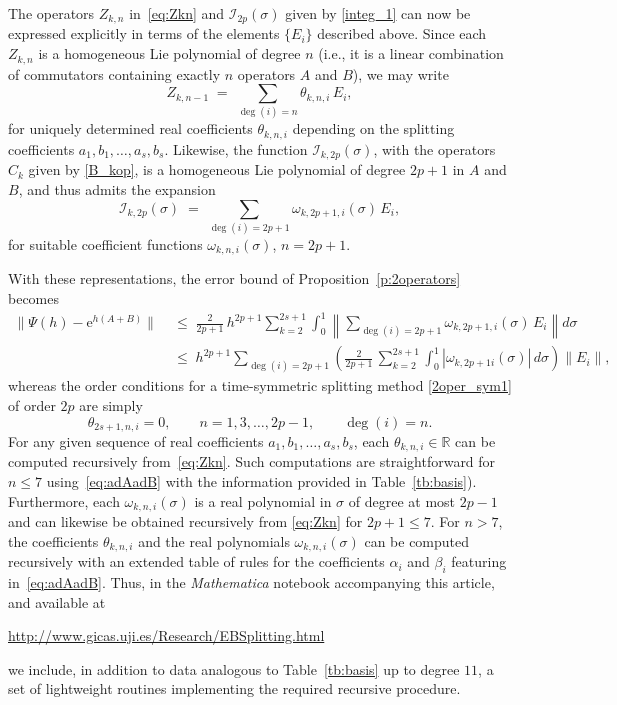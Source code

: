 \documentclass[11pt]{article}
\newcommand{\e}{\ensuremath{\mathrm{e}}}
\begin{document}
The operators $Z_{k,n}$ in~\eqref{eq:Zkn} and $\mathcal{I}_{2p}(\sigma)$ given by \eqref{integ_1}
can now be expressed explicitly 
in terms of the elements $\{E_i\}$ described above.  
Since each $Z_{k,n}$ is a homogeneous Lie polynomial of degree $n$ (i.e., it is a linear combination of commutators containing
exactly $n$ operators $A$ and $B$), we may write
\[
   Z_{k,n-1} \;=\; \sum_{\deg(i)=n} \theta_{k,n,i}\, E_i,
\]
for uniquely determined real coefficients $\theta_{k,n,i}$ depending on the 
splitting coefficients $a_1,b_1,\ldots,a_s,b_s$. Likewise, the function $\mathcal{I}_{k,2p}(\sigma)$, with
the operators $C_k$ given by \eqref{B_kop}, 
is a homogeneous Lie polynomial of degree $2p+1$ in $A$ and $B$, and thus admits the expansion
\[
 \mathcal{I}_{k,2p}(\sigma)   \;=\;
   \sum_{\deg(i)=2p+1} \omega_{k,2p+1,i}(\sigma)\, E_i,
\]
for suitable coefficient functions $\omega_{k,n,i}(\sigma)$, $n=2p+1$.

With these representations, the error bound of 
Proposition~\ref{p:2operators} becomes
\begin{equation} \label{bound_explicit}
\begin{aligned}
   \|\Psi(h) - \e^{h(A+B)}\|
   &\;\le\; \frac{2}{2p+1}\, h^{2p+1}
      \sum_{k=2}^{2s+1} \int_0^1
      \left\|
         \sum_{\deg(i)=2p+1} \omega_{k,2p+1,i}(\sigma)\, E_i
      \right\| d\sigma \\
   &\;\le\;  h^{2p+1}
      \sum_{\deg(i)=2p+1}
      \left(\frac{2}{2p+1}\,
       \sum_{k=2}^{2s+1} 
        \int_0^1 |\omega_{k,2p+1i}(\sigma)|\, d\sigma
      \right)
      \|E_i\|,
\end{aligned}
\end{equation}
%
whereas the order conditions for a time-symmetric splitting method \eqref{2oper_sym1} of order $2p$
are simply
\begin{equation} \label{or_cond}
  \theta_{2s+1,n,i} = 0, \qquad n = 1, 3, \ldots, 2p-1, \qquad \deg(i) = n.
\end{equation}  
%
For any given sequence of real coefficients $a_1,b_1,\ldots,a_s,b_s$, 
each $\theta_{k,n,i} \in \mathbb{R}$ can be computed
recursively from~\eqref{eq:Zkn}. Such computations are straightforward for  
$n\le 7$ using~\eqref{eq:adAadB}  with the information provided in 
Table~\ref{tb:basis}).  
Furthermore, each $\omega_{k,n,i}(\sigma)$ is a real polynomial in $\sigma$ 
of degree at most $2p-1$ and can likewise be obtained recursively from \eqref{eq:Zkn} for $2p+1\leq 7$.  
For $n>7$, the coefficients $\theta_{k,n,i}$ and the real polynomials  $\omega_{k,n,i}(\sigma)$ can be computed recursively with an extended table of rules for the coefficients $\alpha_i$ and $\beta_i$ featuring in~\eqref{eq:adAadB}.  
Thus, in the \emph{Mathematica} notebook accompanying this article, and available at
\begin{center}
  \url{http://www.gicas.uji.es/Research/EBSplitting.html}
\end{center}  
 we include,
in addition to data analogous to Table~\ref{tb:basis} up to degree $11$,
a set of lightweight routines implementing the required recursive procedure.
\end{document}
